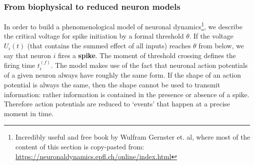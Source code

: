 \documentclass[main]{subfiles}
\begin{document}
\subsubsection{From biophysical to reduced neuron models}
In order to build a phenomenological model of neuronal dynamics\footnote{Incredibly useful and free book by Wulfram Gernster et. al, where most of the content of this section is copy-pasted from: \url{https://neuronaldynamics.epfl.ch/online/index.html}}, we describe the critical voltage for spike initiation by a formal threshold $\theta$. If the voltage $U_i(t)$ (that contains the summed effect of all inputs) reaches $\theta$ from below, we say that neuron $i$ fires a \textbf{spike}. The moment of threshold crossing defines the firing time $t^{(f)}_i$. 
The model makes use of the fact that neuronal action potentials of a given neuron always have roughly the same form. If the shape of an action potential is always the same, then the shape cannot be used to transmit information: rather information is contained in the presence or absence of a spike. Therefore action potentials are reduced to ‘events’ that happen at a precise moment in time.
\end{document}

